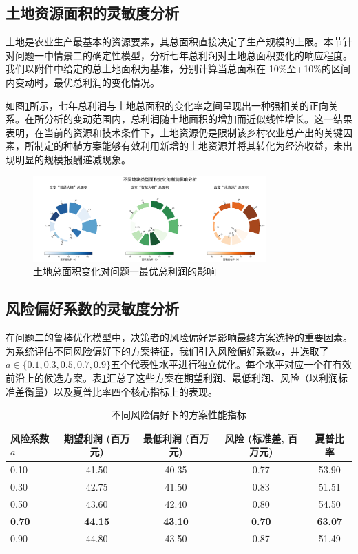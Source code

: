 \subsection{土地资源面积的灵敏度分析}

土地是农业生产最基本的资源要素，其总面积直接决定了生产规模的上限。本节针对问题一中情景二的确定性模型，分析七年总利润对土地总面积变化的响应程度。我们以附件中给定的总土地面积为基准，分别计算当总面积在-10\%至+10\%的区间内变动时，最优总利润的变化情况。

如图\ref{fig:land_sensitivity}所示，七年总利润与土地总面积的变化率之间呈现出一种强相关的正向关系。在所分析的变动范围内，总利润随土地面积的增加而近似线性增长。这一结果表明，在当前的资源和技术条件下，土地资源仍是限制该乡村农业总产出的关键因素，所制定的种植方案能够有效利用新增的土地资源并将其转化为经济收益，未出现明显的规模报酬递减现象。

\begin{figure}[H]
    \centering
    \includegraphics[width=0.8\textwidth]{figs/6灵敏度分析/第一问地块灵敏度圆弧图.png}
    \caption{土地总面积变化对问题一最优总利润的影响}
    \label{fig:land_sensitivity}
\end{figure}


\subsection{风险偏好系数的灵敏度分析}

在问题二的鲁棒优化模型中，决策者的风险偏好是影响最终方案选择的重要因素。为系统评估不同风险偏好下的方案特征，我们引入风险偏好系数$a$，并选取了$a \in \{0.1, 0.3, 0.5, 0.7, 0.9\}$五个代表性水平进行独立优化。每个水平对应一个在有效前沿上的候选方案。表\ref{tab:risk_sensitivity_results}汇总了这些方案在期望利润、最低利润、风险（以利润标准差衡量）以及夏普比率四个核心指标上的表现。

\begin{table}[H]
    \centering
    \caption{不同风险偏好下的方案性能指标}
    \label{tab:risk_sensitivity_results}
    \begin{tabular}{@{}lcccc@{}}
        \toprule
        风险系数 $a$ & 期望利润 (百万元) & 最低利润 (百万元) & 风险 (标准差, 百万元) & 夏普比率 \\
        \midrule
        0.10 & 41.50 & 40.35 & 0.77 & 53.90 \\
        0.30 & 42.75 & 41.50 & 0.83 & 51.51 \\
        0.50 & 43.60 & 42.40 & 0.80 & 54.50 \\
        \textbf{0.70} & \textbf{44.15} & \textbf{43.10} & \textbf{0.70} & \textbf{63.07} \\
        0.90 & 44.80 & 43.50 & 0.87 & 51.49 \\
        \bottomrule
    \end{tabular}
\end{table}

